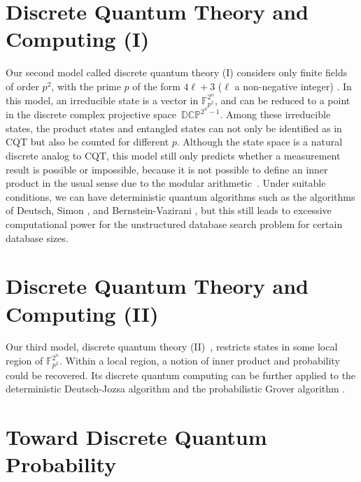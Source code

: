 \documentclass[twoside]{iuphd}
\begin{document}
\section{Discrete Quantum Theory and Computing (I)}

Our second model called discrete quantum theory (I) considers only
finite fields of order $p^{2}$, with the prime $p$ of the form $4\ell+3$
($\ell$ a non-negative integer) \cite{geometry2013,DQT2014}. In
this model, an irreducible state is a vector in $\mathbb{F}_{p^{2}}^{2^{n}}$,
and can be reduced to a point in the discrete complex projective space~$\mathbb{DCP}^{2^{n}-1}$.
Among these irreducible states, the product states and entangled states
can not only be identified as in CQT but also be counted for different
$p$. Although the state space is a natural discrete analog to CQT,
this model still only predicts whether a measurement result is possible
or impossible, because it is not possible to define an inner product
in the usual sense due to the modular arithmetic~\cite{grove2002classical}.
Under suitable conditions, we can have deterministic quantum algorithms
such as the algorithms of Deutsch, Simon \cite{Simon:1994:PQC:1398518.1399019,Mermin2007,Jaeger2007},
and Bernstein-Vazirani \cite{Bernstein:1993:QCT:167088.167097,Mermin2007},
but this still leads to excessive computational power for the unstructured
database search problem for certain database sizes. 

\section{Discrete Quantum Theory and Computing (II)}

Our third model, discrete quantum theory (II)~\cite{DQT2014}, restricts
states in some local region of $\mathbb{F}_{p^{2}}^{2^{n}}$. Within
a local region, a notion of inner product and probability could be
recovered. Its discrete quantum computing can be further applied to
the deterministic Deutsch-Jozsa algorithm \cite{DeutschJozsa1992,Jaeger2007}
and the probabilistic Grover algorithm \cite{Grover:1996:FQM:237814.237866,Mermin2007,Jaeger2007}.

\section{Toward Discrete Quantum Probability}
\end{document}
